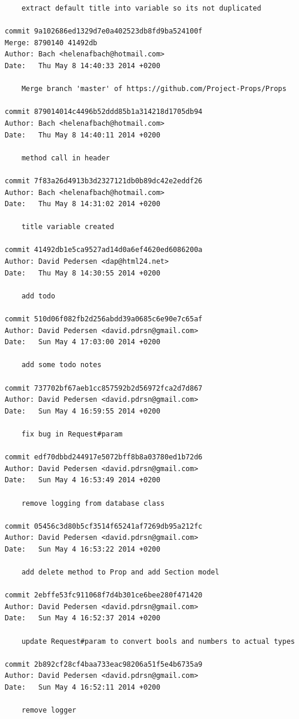 \documentclass[12pt]{article}
\begin{document}
\begin{verbatim}
    extract default title into variable so its not duplicated

commit 9a102686ed1329d7e0a402523db8fd9ba524100f
Merge: 8790140 41492db
Author: Bach <helenafbach@hotmail.com>
Date:   Thu May 8 14:40:33 2014 +0200

    Merge branch 'master' of https://github.com/Project-Props/Props

commit 879014014c4496b52ddd85b1a314218d1705db94
Author: Bach <helenafbach@hotmail.com>
Date:   Thu May 8 14:40:11 2014 +0200

    method call in header

commit 7f83a26d4913b3d2327121db0b89dc42e2eddf26
Author: Bach <helenafbach@hotmail.com>
Date:   Thu May 8 14:31:02 2014 +0200

    title variable created

commit 41492db1e5ca9527ad14d0a6ef4620ed6086200a
Author: David Pedersen <dap@html24.net>
Date:   Thu May 8 14:30:55 2014 +0200

    add todo

commit 510d06f082fb2d256abdd39a0685c6e90e7c65af
Author: David Pedersen <david.pdrsn@gmail.com>
Date:   Sun May 4 17:03:00 2014 +0200

    add some todo notes

commit 737702bf67aeb1cc857592b2d56972fca2d7d867
Author: David Pedersen <david.pdrsn@gmail.com>
Date:   Sun May 4 16:59:55 2014 +0200

    fix bug in Request#param

commit edf70dbbd244917e5072bff8b8a03780ed1b72d6
Author: David Pedersen <david.pdrsn@gmail.com>
Date:   Sun May 4 16:53:49 2014 +0200

    remove logging from database class

commit 05456c3d80b5cf3514f65241af7269db95a212fc
Author: David Pedersen <david.pdrsn@gmail.com>
Date:   Sun May 4 16:53:22 2014 +0200

    add delete method to Prop and add Section model

commit 2ebffe53fc911068f7d4b301ce6bee280f471420
Author: David Pedersen <david.pdrsn@gmail.com>
Date:   Sun May 4 16:52:37 2014 +0200

    update Request#param to convert bools and numbers to actual types

commit 2b892cf28cf4baa733eac98206a51f5e4b6735a9
Author: David Pedersen <david.pdrsn@gmail.com>
Date:   Sun May 4 16:52:11 2014 +0200

    remove logger


\end{verbatim}
\end{document}
